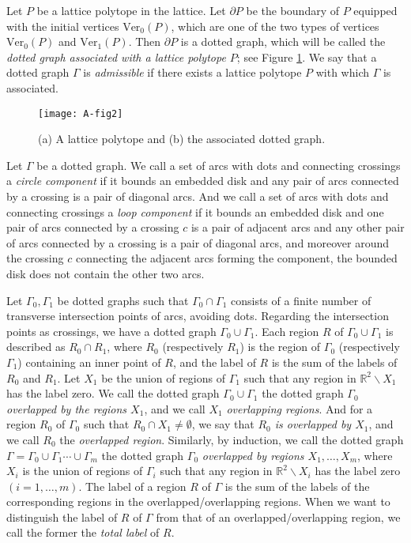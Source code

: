 \documentclass[a4paper,11pt]{amsart}
\numberwithin{equation}{section}
\begin{document}
 

Let $P$ be a lattice polytope in the lattice. 
Let $\partial P$ be the boundary of $P$ equipped with the initial vertices $\mathrm{Ver}_0(P)$, which are one of the two types of vertices $\mathrm{Ver}_0(P)$ and $\mathrm{Ver}_1(P)$. 
Then $\partial P$ is a dotted graph, which will be called the {\it dotted graph associated with a lattice polytope $P$}; see Figure \ref{Fig2}.
We say that a dotted graph $\Gamma$ is {\it admissible} if there exists a lattice polytope $P$ with which $\Gamma$ is associated. 

\begin{figure}[ht]
\centering
\texttt{[image: A-fig2]}
\caption{(a) A lattice polytope and (b) the associated dotted graph.}
\label{Fig2}
\end{figure}


Let $\Gamma$ be a dotted graph. 
We call a set of arcs with dots and connecting crossings a {\it circle component} if it bounds an embedded disk and any pair of arcs connected by a crossing is a pair of diagonal arcs. And we call a set of arcs with dots and connecting crossings a {\it loop component} if it bounds an embedded disk and one pair of arcs connected by a crossing $c$ is a pair of adjacent arcs and 
any other pair of arcs connected by a crossing is a pair of diagonal arcs, and moreover around the crossing $c$ connecting the adjacent arcs forming the component, the bounded disk does not contain the other two arcs. 


Let $\Gamma_0, \Gamma_1$ be dotted graphs such that $\Gamma_0 \cap \Gamma_1$ consists of a finite number of transverse intersection points of arcs, avoiding dots. Regarding the intersection points as crossings, we have a dotted graph 
$\Gamma_0 \cup \Gamma_1$. 
Each region $R$ of $\Gamma_0 \cup \Gamma_1$ is described as $R_0 \cap R_1$, where $R_0$ (respectively $R_1$) is the region of $\Gamma_0$ (respectively $\Gamma_1$) containing an inner point of $R$, and the label of $R$ is the sum of the labels of $R_0$ and $R_1$. 
Let $X_1$ be the union of regions of $\Gamma_1$ such that any region  in $\mathbb{R}^2\backslash X_1$ has the label zero. 
We call the dotted graph $\Gamma_0 \cup \Gamma_1$ the dotted graph $\Gamma_0$ {\it overlapped by the regions $X_1$}, 
and we call $X_1$ {\it overlapping regions}. 
And for a region $R_0$ of $\Gamma_0$ such that $R_0 \cap X_1 \neq \emptyset$, we say that {\it $R_0$ is overlapped by $X_1$}, 
and we call $R_0$ the {\it overlapped region}. 
Similarly, by induction, we call the dotted graph $\Gamma=\Gamma_0  \cup \Gamma_1 \cdots \cup \Gamma_m$ the dotted graph $\Gamma_0$ {\it overlapped by regions $X_1, \ldots, X_m$}, where $X_i$ is the union of regions of $\Gamma_i$ such that any region  in $\mathbb{R}^2\backslash X_i$ has the label zero $(i=1, \ldots, m)$. 
The label of a region $R$ of $\Gamma$ is the sum of the labels of the corresponding regions in the overlapped/overlapping regions. 
When we want to distinguish the label of $R$ of $\Gamma$ from that of an overlapped/overlapping region, we call the former the {\it total label} of $R$. 
\end{document}
